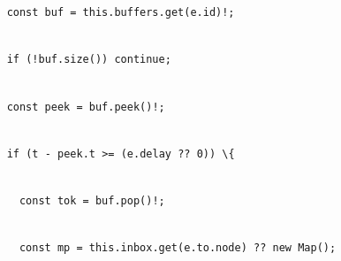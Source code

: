 \documentclass[
]{article}
\newcommand{\passthrough}[1]{#1}
\begin{document}
\passthrough{\lstinline!    !}\passthrough{\lstinline!const!}\passthrough{\lstinline! !}\passthrough{\lstinline!buf!}\passthrough{\lstinline! !}\passthrough{\lstinline!=!}\passthrough{\lstinline! !}\passthrough{\lstinline!this!}\passthrough{\lstinline!.!}\passthrough{\lstinline!buffers!}\passthrough{\lstinline!.!}\passthrough{\lstinline!get!}\passthrough{\lstinline!(!}\passthrough{\lstinline!e!}\passthrough{\lstinline!.!}\passthrough{\lstinline!id!}\passthrough{\lstinline")!;"}\strut \\
\passthrough{\lstinline!    !}\passthrough{\lstinline!if!}\passthrough{\lstinline! !}\passthrough{\lstinline"(!"}\passthrough{\lstinline!buf!}\passthrough{\lstinline!.!}\passthrough{\lstinline!size!}\passthrough{\lstinline!())!}\passthrough{\lstinline! !}\passthrough{\lstinline!continue!}\passthrough{\lstinline!;!}\strut \\
\passthrough{\lstinline!    !}\passthrough{\lstinline!const!}\passthrough{\lstinline! !}\passthrough{\lstinline!peek!}\passthrough{\lstinline! !}\passthrough{\lstinline!=!}\passthrough{\lstinline! !}\passthrough{\lstinline!buf!}\passthrough{\lstinline!.!}\passthrough{\lstinline!peek!}\passthrough{\lstinline"()!;"}\strut \\
\passthrough{\lstinline!    !}\passthrough{\lstinline!if!}\passthrough{\lstinline! !}\passthrough{\lstinline!(!}\passthrough{\lstinline!t!}\passthrough{\lstinline! !}\passthrough{\lstinline!-!}\passthrough{\lstinline! !}\passthrough{\lstinline!peek!}\passthrough{\lstinline!.!}\passthrough{\lstinline!t!}\passthrough{\lstinline! !}\passthrough{\lstinline!>=!}\passthrough{\lstinline! !}\passthrough{\lstinline!(!}\passthrough{\lstinline!e!}\passthrough{\lstinline!.!}\passthrough{\lstinline!delay!}\passthrough{\lstinline! !}\passthrough{\lstinline!??!}\passthrough{\lstinline! !}\passthrough{\lstinline!0))!}\passthrough{\lstinline! !}\passthrough{\lstinline!\{!}\strut \\
\passthrough{\lstinline!      !}\passthrough{\lstinline!const!}\passthrough{\lstinline! !}\passthrough{\lstinline!tok!}\passthrough{\lstinline! !}\passthrough{\lstinline!=!}\passthrough{\lstinline! !}\passthrough{\lstinline!buf!}\passthrough{\lstinline!.!}\passthrough{\lstinline!pop!}\passthrough{\lstinline"()!;"}\strut \\
\passthrough{\lstinline!      !}\passthrough{\lstinline!const!}\passthrough{\lstinline! !}\passthrough{\lstinline!mp!}\passthrough{\lstinline! !}\passthrough{\lstinline!=!}\passthrough{\lstinline! !}\passthrough{\lstinline!this!}\passthrough{\lstinline!.!}\passthrough{\lstinline!inbox!}\passthrough{\lstinline!.!}\passthrough{\lstinline!get!}\passthrough{\lstinline!(!}\passthrough{\lstinline!e!}\passthrough{\lstinline!.!}\passthrough{\lstinline!to!}\passthrough{\lstinline!.!}\passthrough{\lstinline!node!}\passthrough{\lstinline!)!}\passthrough{\lstinline! !}\passthrough{\lstinline!??!}\passthrough{\lstinline! !}\passthrough{\lstinline!new!}\passthrough{\lstinline! !}\passthrough{\lstinline!Map!}\passthrough{\lstinline!();!}\strut \\
\end{document}
